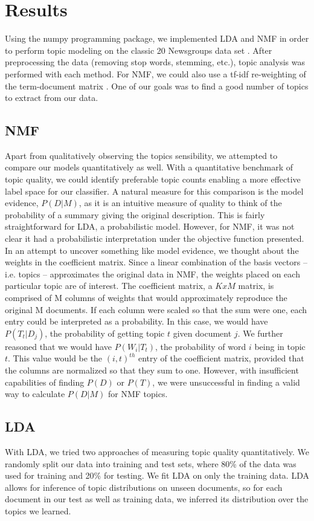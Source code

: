 \documentclass[10pt]{article}
\begin{document}
\section{Results}
Using the numpy programming package, we implemented LDA and NMF in order to perform topic modeling on the classic 20 Newsgroups data set \cite{newsgroups}.  After preprocessing the data (removing stop words, stemming, etc.), topic analysis was performed with each method.  For NMF, we could also use a tf-idf re-weighting of the term-document matrix \cite{tf-idf}.  One of our goals was to find a good number of topics to extract from our data. 

\subsection{NMF}
Apart from qualitatively observing the topics sensibility, we attempted to compare our models quantitatively as well.  With a quantitative benchmark of topic quality, we could identify preferable topic counts enabling a more effective label space for our classifier.  A natural measure for this comparison is the model evidence, $P(D|M)$, as it is an intuitive measure of quality to think of the probability of a summary giving the original description.  This is fairly straightforward for LDA, a probabilistic model.  However, for NMF, it was not clear it had a probabilistic interpretation under the objective function presented.  In an attempt to uncover something like model evidence, we thought about the weights in the coefficient matrix.  Since a linear combination of the basis vectors -- i.e. topics -- approximates the original data in NMF, the weights placed on each particular topic are of interest.  The coefficient matrix, a $K x M$ matrix, is comprised of M columns of weights that would approximately reproduce the original M documents.  If each column were scaled so that the sum were one, each entry could be interpreted as a probability.  In this case, we would have $P(T_t|D_j)$, the probability of getting topic $t$ given document $j$.  We further reasoned that we would have $P(W_i|T_t)$, the probability of word $i$ being in topic $t$.  This value would be the $(i,t)^{th}$ entry of the coefficient matrix, provided that the columns are normalized so that they sum to one.  However, with insufficient capabilities of finding $P(D)$ or $P(T)$, we were unsuccessful in finding a valid way to calculate $P(D|M)$ for NMF topics.

\subsection{LDA}
With LDA, we tried two approaches of measuring topic quality quantitatively.  We randomly split our data into training and test sets, where 80\% of the data was used for training and 20\% for testing.  We fit LDA on only the training data.  LDA allows for inference of topic distributions on unseen documents, so for each document in our test as well as training data, we inferred its distribution over the topics we learned.  
\end{document}
